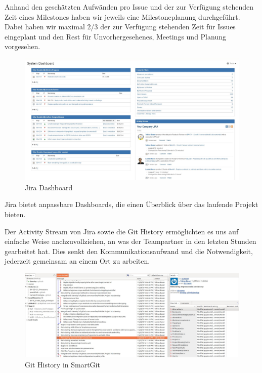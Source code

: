 		Anhand den geschätzten Aufwänden
		pro Issue und der zur Verfügung stehenden Zeit eines Milestones haben wir jeweils eine Milestoneplanung durchgeführt.		
		Dabei haben wir maximal 2/3 der zur Verfügung stehenden Zeit für
		Issues eingeplant und den Rest für Unvorhergesehenes, 
		Meetings und Planung vorgesehen.
		
		\begin{figure}[H]
			\includegraphics[width=\textwidth]{projectPlan/media/img/jiraDashBoard.jpg}
			\centering
			\caption{Jira Dashboard}
			\label{fig:jiraDashBoard}
		\end{figure}
		
		Jira bietet anpassbare Dashboards, 
		die einen Überblick über das laufende Projekt bieten.
		
		Der Activity Stream von Jira sowie die Git History ermöglichten es uns auf einfache Weise nachzuvollziehen,
		an was der Teampartner in den letzten Stunden gearbeitet hat. 
		Dies senkt den Kommunikationsaufwand und die Notwendigkeit,
		jederzeit gemeinsam an einem Ort zu arbeiten.
		
		\begin{figure}[H]
			\includegraphics[width=\textwidth]{projectPlan/media/img/gitHistory.jpg}
			\centering
			\caption{Git History in SmartGit}
			\label{fig:gitHistory}
		\end{figure}
		
